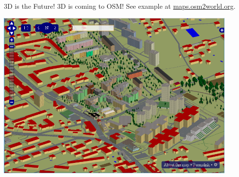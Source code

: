 \documentclass{beamer}
\begin{document}
\begin{frame}{3D is the Future!}
  3D is coming to OSM! See example at \href{http://maps.osm2world.org/?zoom=17&lat=47.06156&lon=15.46983&layers=BF0FTFFF}{maps.osm2world.org}.

  \includegraphics[width=0.9\textwidth]{3d.png}


\end{frame}
% 
% 
% 
% 
% 
% 
% 
\end{document}

